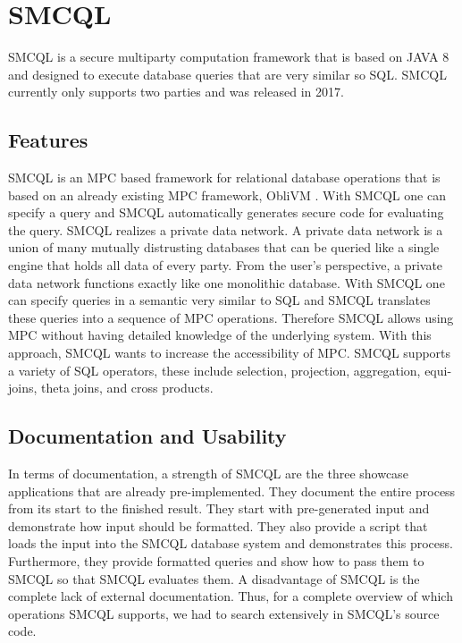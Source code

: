 \section{SMCQL}
SMCQL \cite{bater} is a secure multiparty computation framework that is based on JAVA 8 and designed to execute database queries that are very similar so SQL. SMCQL currently only supports two parties and was released in 2017.
\subsection{Features}
SMCQL is an MPC based framework for relational database operations that is based on an already existing MPC framework,  ObliVM \cite{liu2015oblivm}. With SMCQL one can specify a query and SMCQL automatically generates secure code for evaluating the query. 
SMCQL realizes a private data network. A private data network is a union of many mutually distrusting databases that can be queried like a single engine that holds all data of every party. From the user's perspective, a private data network functions exactly like one monolithic database. With SMCQL one can specify queries in a semantic very similar to SQL and SMCQL translates these queries into a sequence of MPC operations. Therefore SMCQL allows using MPC without having detailed knowledge of the underlying system. With this approach, SMCQL wants to increase the accessibility of MPC. SMCQL supports a variety of SQL operators, these include selection, projection, aggregation, equi-joins, theta joins, and cross products. 


\subsection{Documentation and Usability}
In terms of documentation, a strength of SMCQL are the three showcase applications that are already pre-implemented. They document the entire process from its start to the finished result. They start with pre-generated input and demonstrate how input should be formatted. They also provide a script that loads the input into the SMCQL database system and demonstrates this process. Furthermore, they provide formatted queries and show how to pass them to SMCQL so that SMCQL evaluates them. A disadvantage of SMCQL is the complete lack of external documentation. Thus, for a complete overview of which operations SMCQL supports, we had to search extensively in SMCQL's source code.



